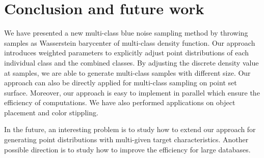 \section{Conclusion and future work}
We have presented a new multi-class blue noise sampling method by
throwing samples as  Wasserstein barycenter of multi-class density function.
Our approach introduces weighted parameters to explicitly adjust point distributions of each individual class and the combined classes.
By adjusting the discrete density value at samples,
we are able to generate multi-class samples with different size.
Our approach can also be directly applied for multi-class sampling on point set surface.
Moreover, our approach is easy to implement in parallel which ensure the efficiency of computations.
We have also performed applications on object placement and color stippling.

In the future,
an interesting problem is to study how to extend our approach for generating point distributions with multi-given target characteristics.
Another possible direction is to study how to improve the efficiency for large databases.